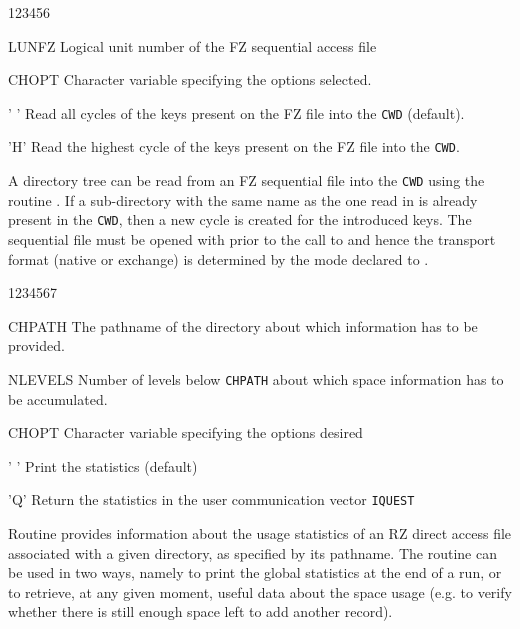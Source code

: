 \begin{DLtt}{123456}
\item[LUNFZ]Logical unit number of the FZ sequential access file
\item[CHOPT]Character variable specifying the options selected.
\begin{DLtt}{12}
\item[' ']Read all cycles of the keys present on the FZ file into the
{\tt CWD} (default).
\item['H']Read the highest cycle of the keys present on the FZ file into
the {\tt CWD}.
\end{DLtt}
\end{DLtt}

A directory tree can be read
from an FZ sequential file
into the {\tt CWD} using the routine .
If a sub-directory with the same name as the one read in is already
present in the {\tt CWD}, then a new cycle is created for the introduced keys.
The sequential file must be opened with 
prior to the call to 
and hence the transport format (native or exchange)
is determined by the mode declared to .



\begin{DLtt}{1234567}
\item[CHPATH]The pathname of the directory about which information
has to be provided.
\item[NLEVELS]Number of levels below {\tt CHPATH} about which space information
has to be accumulated.
\item[CHOPT]Character variable specifying the options desired
\begin{DLtt}{12}
\item[' ']Print the statistics (default)
\item['Q']Return the statistics in the user communication vector {\tt IQUEST}\\
\end{DLtt}
\end{DLtt}

Routine  provides information about the usage statistics
of an RZ direct access file associated with a given directory,
as specified by its pathname.
The routine can be used in two ways,
namely to print the global statistics at the end of a run, or
to retrieve, at any given moment, useful data about the space usage
(e.g. to verify whether there is
still enough space left to add another record).

